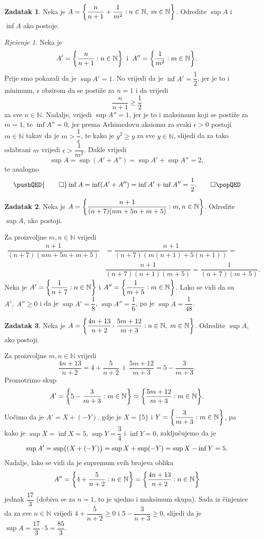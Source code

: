 \documentclass{book}
\let\originalleft\left
\let\originalright\right
\renewcommand{\left}{\mathopen{}\mathclose\bgroup\originalleft}
\renewcommand{\right}{\aftergroup\egroup\originalright}
\renewenvironment{proof}{%
    \vspace{-\parskip}\begin{oldproof}%
    }{%
    \end{oldproof}%
}
\theoremstyle{definition}
\theoremstyle{definition}
\newtheorem{exercise}{Zadatak}
\theoremstyle{remark}
\newtheorem*{proof*}{Rješenje}
\begin{document}
\begin{exercise}
Neka je $A=\left\{\dfrac{n}{n+1}+\dfrac{1}{m^2} : n\in \mathbb{N},\; m\in \mathbb{N}\right\}$. Odredite $\sup{A}$ i $\inf{A}$ ako postoje.
\end{exercise}
\begin{proof*}
Neka je $$A'=\left\{\dfrac{n}{n+1} : n\in \mathbb{N}\right\}\;\;\text{i}\;\;A''=\left\{\dfrac{1}{m^2} : m\in \mathbb{N}\right\}.$$ Prije smo pokazali da je $\sup{A'}=1$. No vrijedi da je $\inf{A'}=\dfrac{1}{2}$, jer je to i minimum, s obzirom da se postiže za $n=1$ i da vrijedi $$\dfrac{n}{n+1}\geq\dfrac{1}{2}$$ za sve $n\in \mathbb{N}$. Nadalje, vrijedi $\sup{A''}=1$, jer je to i maksimum koji se postiže za $m=1$, te $\inf{A''}=0$, jer prema Arhimedovu aksiomu za svaki $\epsilon>0$ postoji $m\in \mathbb{N}$ takav da je $m>\dfrac{1}{\epsilon}$, te kako je $y^2\geq y$ za sve $y\in \mathbb{N}$, slijedi da za tako odabrani $m$ vrijedi $\epsilon>\dfrac{1}{m^2}$. Dakle vrijedi $$\sup{A}=\sup(A'+A'')=\sup{A'}+\sup{A''}=2,$$ 
te analogno \[\pushQED{\qed}
\inf{A}=\inf(A'+A'')=\inf{A'}+\inf{A''}=\dfrac{1}{2}.\qedhere
\popQED
\]
\end{proof*}
\begin{exercise}
Neka je $A=\left\{\dfrac{n+1}{(n+7)(nm+5n+m+5)} : m, n\in \mathbb{N}\right\}$. Odredite $\sup{A}$, ako postoji.
\end{exercise}
\begin{proof}[Rješenje]
Za proizvoljne $m, n\in \mathbb{N}$ vrijedi
\begin{align*}
\dfrac{n+1}{(n+7)(nm+5n+m+5)}&=\dfrac{n+1}{(n+7)(m(n+1)+5(n+1))}=\\
&\dfrac{n+1}{(n+7)(n+1)(m+5)}=\dfrac{1}{(n+7)(m+5)}.
\end{align*}
Neka je $A'=\left\{\dfrac{1}{n+7} : n\in \mathbb{N}\right\}$ i $A''=\left\{\dfrac{1}{m+5} : m\in \mathbb{N}\right\}$. Lako se vidi da su $A',\; A''\geq 0$ i da je $\sup{A'}=\dfrac{1}{8}$, $\sup{A''}=\dfrac{1}{6}$, pa je $\sup{A}=\dfrac{1}{48}$.
\end{proof}
\begin{exercise}
Neka je $A=\left\{\dfrac{4n+13}{n+2}\cdot \dfrac{5m+12}{m+3} : n\in \mathbb{N},\; m\in \mathbb{N}\right\}$. Odredite $\sup{A}$, ako postoji.
\end{exercise}
\begin{proof}[Rješenje]
Za proizvoljne $m, n\in \mathbb{N}$ vrijedi $$\dfrac{4n+13}{n+2}=4+\dfrac{5}{n+2}\;\;\text{i}\;\;\dfrac{5m+12}{m+3}=5-\dfrac{3}{m+3}.$$
Promotrimo skup 
$$A'=\left\{5-\dfrac{3}{m+3} : m\in \mathbb{N}\right\}=\left\{\dfrac{5m+12}{m+3} : m\in \mathbb{N}\right\}.$$
Uočimo da je $A'=X+(-Y)$, gdje je $X=\{5\}$ i $Y=\left\{\dfrac{3}{m+3} : m\in \mathbb{N}\right\}$, pa kako je $\sup{X}=\inf{X}=5$, $\sup{Y}=\dfrac{3}{4}$ i $\inf{Y}=0$, zaključujemo da je $$\sup{A'}=\sup\left((X+(-Y)\right)=\sup{X}+\sup(-Y)=\sup{X}-\inf{Y}=5.$$ Nadalje, lako se vidi da je supremum svih brojeva oblika $$A''=\left\{4+\dfrac{5}{n+2} : n\in \mathbb{N}\right\}=\left\{\dfrac{4n+13}{n+2} : n\in \mathbb{N}\right\}$$ jednak $\dfrac{17}{3}$ (dobiva se za $n=1$, to je ujedno i maksimum skupa). Sada iz činjenice da za sve $n\in \mathbb{N}$ vrijedi $4+\dfrac{5}{n+2}\geq 0$ i $5-\dfrac{3}{n+3}\geq 0$, slijedi da je $\sup{A}=\dfrac{17}{3}\cdot 5=\dfrac{85}{3}$.
\end{proof}
\end{document}
